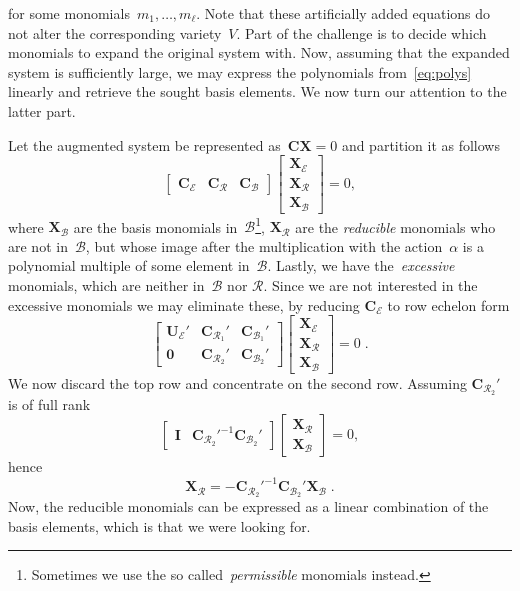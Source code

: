 \documentclass[11pt,a4paper]{article}
\theoremstyle{definition}
\newcommand{\mat}[1]{\bm{#1}}
\newcommand{\CE}{\ensuremath{\mat{C}_\mathcal{E}}}
\newcommand{\CR}{\ensuremath{\mat{C}_\mathcal{R}}}
\newcommand{\CB}{\ensuremath{\mat{C}_\mathcal{B}}}
\newcommand{\CRk}[1]{\ensuremath{\mat{C}_{\mathcal{R}_{#1}}}}
\newcommand{\CBk}[1]{\ensuremath{\mat{C}_{\mathcal{B}_{#1}}}}
\newcommand{\XE}{\ensuremath{\mat{X}_\mathcal{E}}}
\newcommand{\XR}{\ensuremath{\mat{X}_\mathcal{R}}}
\newcommand{\XB}{\ensuremath{\mat{X}_\mathcal{B}}}
\begin{document}
for some monomials~$m_1,\ldots, m_\ell$. Note that these artificially added equations do not alter
the corresponding variety~$V$.
Part of the challenge is to decide which monomials to expand the original system with.
Now, assuming that the expanded system is sufficiently large, we may express the polynomials
from~\eqref{eq:polys} linearly and retrieve the sought basis elements. We now turn our attention
to the latter part.

Let the augmented system be represented as~$\mat{CX}=0$ and partition it as follows
\begin{equation}
    \begin{bmatrix}
        \CE &
        \CR &
        \CB
    \end{bmatrix}
    \begin{bmatrix}
        \XE \\
        \XR \\
        \XB
    \end{bmatrix}
    = 0,
\end{equation}
where $\XB$ are the basis monomials in~$\mathcal{B}$\footnote{Sometimes we use the so called~\emph{permissible} monomials instead.},
$\XR$ are the \emph{reducible} monomials who are
not in~$\mathcal{B}$, but whose image after the multiplication with the action~$\alpha$ is a
polynomial multiple of some element in~$\mathcal{B}$. Lastly, we have the~\emph{excessive}
monomials, which are neither in~$\mathcal{B}$ nor $\mathcal{R}$.
Since we are not interested in the excessive monomials we may eliminate these,
by reducing $\CE$ to row echelon form
\begin{equation}
    \begin{bmatrix}
        \mat{U}_\mathcal{E}' &
        \CRk{1}' &
        \CBk{1}' \\
        \mat{0} &
        \CRk{2}' &
        \CBk{2}'
    \end{bmatrix}
    \begin{bmatrix}
        \XE \\
        \XR \\
        \XB
    \end{bmatrix}
    = 0\;.
\end{equation}
We now discard the top row and concentrate on the second row. Assuming $\CRk{2}'$ is of full rank
\begin{equation}
    \begin{bmatrix}
        \mat{I} &
        \CRk{2}'^{-1}\CBk{2}'
    \end{bmatrix}
    \begin{bmatrix}
        \XR \\
        \XB
    \end{bmatrix}
    = 0,
\end{equation}
hence
\begin{equation}
    \XR = -\CRk{2}'^{-1}\CBk{2}'\XB\;.
\end{equation}
Now, the reducible monomials can be expressed as a linear combination of the basis elements,
which is that we were looking for.
\end{document}
